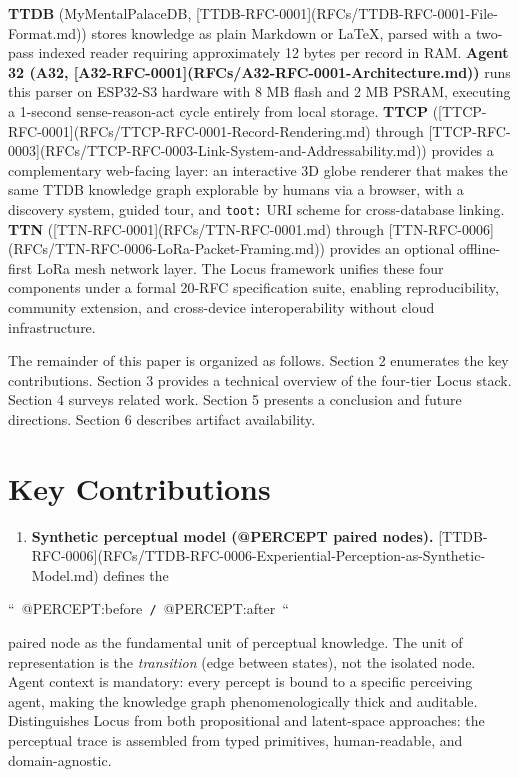 \documentclass[11pt]{article}
\begin{document}
\textbf{TTDB} (MyMentalPalaceDB, [TTDB-RFC-0001](RFCs/TTDB-RFC-0001-File-Format.md)) stores knowledge as plain Markdown or LaTeX, parsed with a two-pass indexed reader requiring approximately 12 bytes per record in RAM. \textbf{Agent 32 (A32, [A32-RFC-0001](RFCs/A32-RFC-0001-Architecture.md))} runs this parser on ESP32-S3 hardware with 8 MB flash and 2 MB PSRAM, executing a 1-second sense-reason-act cycle entirely from local storage. \textbf{TTCP} ([TTCP-RFC-0001](RFCs/TTCP-RFC-0001-Record-Rendering.md) through [TTCP-RFC-0003](RFCs/TTCP-RFC-0003-Link-System-and-Addressability.md)) provides a complementary web-facing layer: an interactive 3D globe renderer that makes the same TTDB knowledge graph explorable by humans via a browser, with a discovery system, guided tour, and \texttt{toot:} URI scheme for cross-database linking. \textbf{TTN} ([TTN-RFC-0001](RFCs/TTN-RFC-0001.md) through [TTN-RFC-0006](RFCs/TTN-RFC-0006-LoRa-Packet-Framing.md)) provides an optional offline-first LoRa mesh network layer. The Locus framework unifies these four components under a formal 20-RFC specification suite, enabling reproducibility, community extension, and cross-device interoperability without cloud infrastructure.

The remainder of this paper is organized as follows. Section 2 enumerates the key contributions. Section 3 provides a technical overview of the four-tier Locus stack. Section 4 surveys related work. Section 5 presents a conclusion and future directions. Section 6 describes artifact availability.



\section{Key Contributions}


\begin{enumerate}[leftmargin=*, label=\textbf{\arabic*.}]

\item \textbf{Synthetic perceptual model (@PERCEPT paired nodes).}
[TTDB-RFC-0006](RFCs/TTDB-RFC-0006-Experiential-Perception-as-Synthetic-Model.md) defines the

\end{enumerate}

``\texttt{ }@PERCEPT:before\texttt{ / }@PERCEPT:after\texttt{ }``

paired node as the fundamental unit of perceptual knowledge. The unit of representation is the \emph{transition} (edge between states), not the isolated node. Agent context is mandatory: every percept is bound to a specific perceiving agent, making the knowledge graph phenomenologically thick and auditable. Distinguishes Locus from both propositional and latent-space approaches: the perceptual trace is assembled from typed primitives, human-readable, and domain-agnostic.
\end{document}

